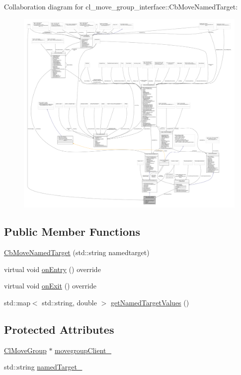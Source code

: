 Collaboration diagram for cl\+\_\+move\+\_\+group\+\_\+interface\+:\+:Cb\+Move\+Named\+Target\+:
\nopagebreak
\begin{figure}[H]
\begin{center}
\leavevmode
\includegraphics[width=350pt]{classcl__move__group__interface_1_1CbMoveNamedTarget__coll__graph}
\end{center}
\end{figure}
\subsection*{Public Member Functions}
\begin{DoxyCompactItemize}
\item 
\hyperlink{classcl__move__group__interface_1_1CbMoveNamedTarget_a55695b8124fcd03d67981b95abeec111}{Cb\+Move\+Named\+Target} (std\+::string namedtarget)
\item 
virtual void \hyperlink{classcl__move__group__interface_1_1CbMoveNamedTarget_ab212edda280e896977d7ac567e4c1b29}{on\+Entry} () override
\item 
virtual void \hyperlink{classcl__move__group__interface_1_1CbMoveNamedTarget_ae7e89742c903577b71790370714047d8}{on\+Exit} () override
\item 
std\+::map$<$ std\+::string, double $>$ \hyperlink{classcl__move__group__interface_1_1CbMoveNamedTarget_ac94f8fe129d4f7f19a431230630c08eb}{get\+Named\+Target\+Values} ()
\end{DoxyCompactItemize}
\subsection*{Protected Attributes}
\begin{DoxyCompactItemize}
\item 
\hyperlink{classcl__move__group__interface_1_1ClMoveGroup}{Cl\+Move\+Group} $\ast$ \hyperlink{classcl__move__group__interface_1_1CbMoveNamedTarget_ab19a253b419bdbf3ec4b4b45a4198a65}{movegroup\+Client\+\_\+}
\item 
std\+::string \hyperlink{classcl__move__group__interface_1_1CbMoveNamedTarget_a597a5afdcba0359aaa8d3f923fdfe133}{named\+Target\+\_\+}
\end{DoxyCompactItemize}
